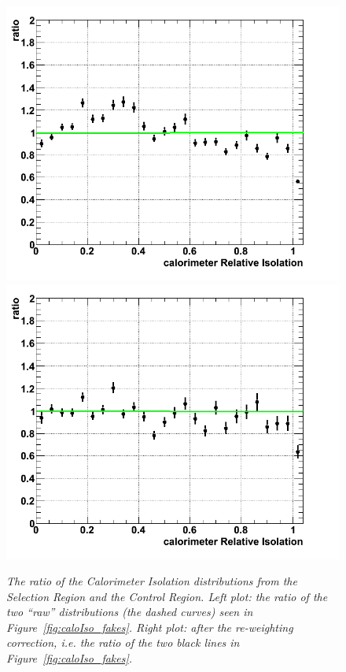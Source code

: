 \begin{figure}[h!]
\centering
\includegraphics[scale=0.32]{Plots/ratio_control_fakesHF.png}
\includegraphics[scale=0.32]{Plots/ratio_re-control_fakesHF.png}
\caption{\textit{The ratio of the Calorimeter Isolation distributions from the Selection Region and the Control Region.  Left plot: the ratio of the two ``raw'' distributions (the dashed curves) seen in Figure~\ref{fig:caloIso_fakes}.  Right plot: {\it after} the re-weighting correction, i.e. the ratio of the two black lines in Figure~\ref{fig:caloIso_fakes}.}}\label{fig:ratio_control_fakesHF}
\end{figure}

